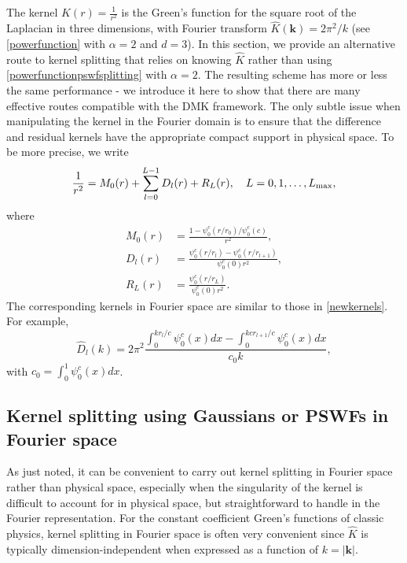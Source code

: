\documentclass[final,letterpaper]{siamart171218}
\newcommand{\be}{\begin{equation}}
\newcommand{\ee}{\end{equation}}
\newcommand{\ba}{\begin{aligned}}
\newcommand{\ea}{\end{aligned}}
\newcommand{\bk}{\boldsymbol{k}}
\newcommand{\psic}{{\psi_0^c}}
\newcommand{\acron}{DMK }
\newcommand{\cR}{r}
\begin{document}
The kernel $K(r) = \frac{1}{r^2}$ is the Green's function for the square root of the Laplacian
in three dimensions, with Fourier transform $\widehat{K}(\bk) = 2\pi^2/k$ (see
\cref{powerfunction} with $\alpha=2$ and $d=3$). In this section, we provide an alternative
route to kernel splitting that relies on knowing $\widehat{K}$ rather than
using \cref{powerfunctionpswfsplitting} with $\alpha=2$. The resulting scheme has more or
less the same performance - we introduce it here to show that there are many effective routes
compatible with the \acron framework.
The only subtle issue when manipulating the kernel in the Fourier domain is to
ensure that the difference and residual kernels have the appropriate
compact support in physical space. To be more precise, we write  
\be\label{sl3dpswfsplitting}
\frac{1}{r^2}  = M_0(r) + \sum_{l=0}^{L-1} D_l(r) + R_L(r), \quad L=0, 1, \ldots, L_{\rm max},
\ee
where
\be\label{sl3dpswfkernels}
\ba
M_0(r) &= \frac{1-\psic(r/\cR_0)/\psic(c)}{r^2},\\
D_l(r) &=\frac{\psic(r/\cR_{l})-\psic(r/\cR_{l+1})}{\psic(0)r^2},\\
R_L(r) &=\frac{\psic(r/\cR_L)}{\psic(0)r^2}.
\ea
\ee
The corresponding kernels in Fourier space are similar to those in \cref{newkernels}.
For example,
\be
\hat{D}_l(k)=2\pi^2\frac{\int_0^{k \cR_l/c}\psic(x)dx-\int_0^{kc\cR_{l+1}/c}\psic(x)dx}{c_0 k},
\ee
with $c_0 = \int_{0}^1 \psic(x)dx$.

\subsection{Kernel splitting using Gaussians or PSWFs in Fourier space} \label{fsplitpwsf}

As just noted, it can be convenient to carry out kernel splitting 
in Fourier space rather than physical space, 
especially when the singularity of the kernel is difficult
to account for in physical space, but straightforward to handle in the Fourier representation.
For the constant coefficient Green's functions of classic physics, 
kernel splitting in Fourier space is often very convenient since $\widehat{K}$ is typically
dimension-independent when expressed as a function of $k= |\bk|$.
\end{document}
